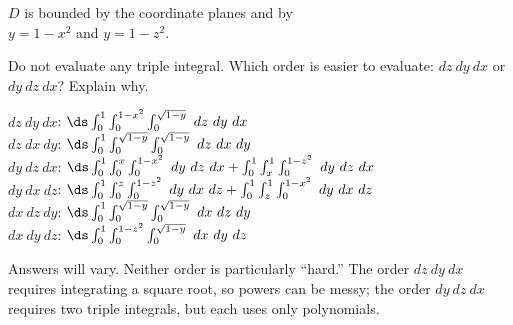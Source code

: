 {$D$ is bounded by the coordinate planes and by \\
$y=1-x^2$ and $y=1-z^2$.

Do not evaluate  any triple integral. Which order is easier to evaluate: $dz\ dy\ dx$ or $dy\ dz\ dx$? Explain why.

}
{$dz\ dy\ dx$: $\ds\int_{0}^1\int_{0}^{1-x^2}\int_{0}^{\sqrt{1-y}}\ dz\ dy\ dx$\\
	$dz\ dx\ dy$: $\ds\int_{0}^1\int_{0}^{\sqrt{1-y}}\int_{0}^{\sqrt{1-y}}\ dz\ dx\ dy$\\
	$dy\ dz\ dx$: $\ds\int_{0}^1\int_0^{x}\int_{0}^{1-x^2}\ dy\ dz\ dx + \int_{0}^1\int_x^{1}\int_{0}^{1-z^2}\ dy\ dz\ dx$\\
	$dy\ dx\ dz$: $\ds\int_0^1\int_{0}^{z}\int_{0}^{1-z^2}\ dy\ dx\ dz+\int_0^1\int_{z}^{1}\int_{0}^{1-x^2}\ dy\ dx\ dz$\\
	$dx\ dz\ dy$: $\ds\int_{0}^1\int_{0}^{\sqrt{1-y}}\int_{0}^{\sqrt{1-y}}\ dx\ dz\ dy$\\
	$dx\ dy\ dz$: $\ds\int_0^1\int_{0}^{1-z^2}\int_{0}^{\sqrt{1-y}}\ dx\ dy\ dz$
	
	Answers will vary. Neither order is particularly ``hard.'' The order $dz\ dy\ dx$ requires integrating a square root, so powers can be messy; the order $dy\ dz\ dx$ requires two triple integrals, but each uses only polynomials. 
}
